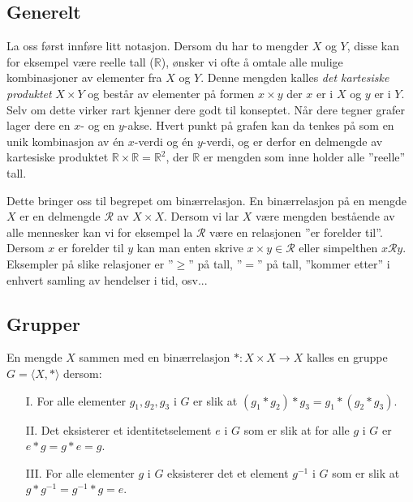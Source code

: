 \documentclass[a4paper, norsk, 12pt]{article}
\begin{document}
\subsection*{Generelt}
La oss først innføre litt notasjon. Dersom du har to mengder $X$ og $Y$, disse kan for eksempel være reelle tall ($\mathbb{R}$), ønsker vi ofte å omtale alle mulige kombinasjoner av elementer fra $X$ og $Y$. Denne mengden kalles {\it det kartesiske produktet} $X\times Y$ og består av elementer på formen $x\times y$ der $x$ er i $X$ og $y$ er i $Y$. Selv om dette virker rart kjenner dere godt til konseptet. Når dere tegner grafer lager dere en $x$- og en $y$-akse. Hvert punkt på grafen kan da tenkes på som en unik kombinasjon av én $x$-verdi og én $y$-verdi, og er derfor en delmengde av kartesiske produktet $\mathbb{R} \times \mathbb{R} = \mathbb{R}^2$, der $\mathbb{R}$ er mengden som inne holder alle ''reelle'' tall. \par 
Dette bringer oss til begrepet om binærrelasjon. En binærrelasjon på en mengde $X$ er en delmengde $\mathcal{R}$ av $X \times X$. Dersom vi lar $X$ være mengden bestående av alle mennesker kan vi for eksempel la $\mathcal{R}$ være en relasjonen ''er forelder til''. Dersom $x$ er forelder til $y$ kan man enten skrive $x \times y \in \mathcal{R}$ eller simpelthen $x\mathcal{R} y$. Eksempler på slike relasjoner er ''$\geq$'' på tall, ''$=$'' på tall, ''kommer etter'' i enhvert samling av hendelser i tid, osv...   

\subsection*{Grupper}
En mengde $X$ sammen med en binærrelasjon $*:X\times X\rightarrow X$ kalles en gruppe $G=\langle X,*\rangle$ dersom:
\begin{itemize}
\item[I.] For alle elementer $g_1,g_2,g_3$ i $G$ er slik at $(g_1*g_2)*g_3=g_1*(g_2*g_3)$.
\item[II.] Det eksisterer et identitetselement $e$ i $G$ som er slik at for alle $g$ i $G$ er $e*g=g*e=g$.
\item[III.]	For alle elementer $g$ i $G$ eksisterer det et element $g^{-1}$ i $G$ som er slik at $g*g^{-1}=g^{-1}*g=e$.
\end{itemize}
  
\end{document}
